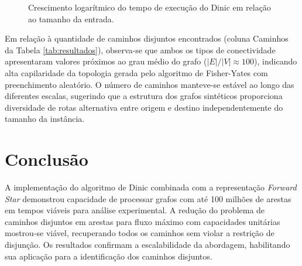 \documentclass[12pt]{article}
\begin{document}
\begin{figure}[htbp]
    \centering
    \caption{Crescimento logarítmico do tempo de execução do Dinic em relação ao tamanho da entrada.}
    \label{fig:line-growth}
\end{figure}

Em relação à quantidade de caminhos disjuntos encontrados (coluna Caminhos da Tabela \ref{tab:resultados}), observa-se que ambos os tipos de conectividade apresentaram valores próximos ao grau médio do grafo ($|E|/|V| \approx 100$), indicando alta capilaridade da topologia gerada pelo algoritmo de Fisher-Yates com preenchimento aleatório. O número de caminhos manteve-se estável ao longo das diferentes escalas, sugerindo que a estrutura dos grafos sintéticos proporciona diversidade de rotas alternativa entre origem e destino independentemente do tamanho da instância.

\section{Conclusão}

A implementação do algoritmo de Dinic combinada com a representação \textit{Forward Star} demonstrou capacidade de processar grafos com até 100 milhões de arestas em tempos viáveis para análise experimental. A redução do problema de caminhos disjuntos em arestas para fluxo máximo com capacidades unitárias mostrou-se viável, recuperando todos os caminhos sem violar a restrição de disjunção. Os resultados confirmam a escalabilidade da abordagem, habilitando sua aplicação para a identificação dos caminhos disjuntos.
\end{document}
